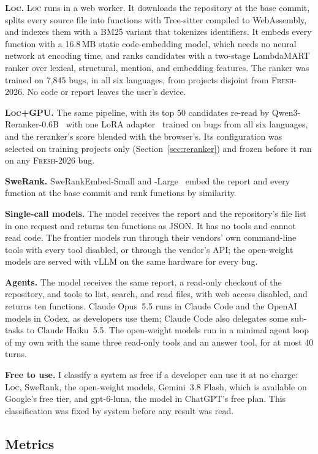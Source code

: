 \documentclass[acmsmall,screen,review,anonymous]{acmart}
\newcommand{\tool}{\textsc{Loc}\xspace}
\newcommand{\tool}{Allfather\xspace}
\newcommand{\toolgpu}{\tool{}+GPU\xspace}
\newcommand{\fresh}{\textsc{Fresh-2026}\xspace}
\begin{document}
\textbf{\tool.} \tool runs in a web worker. It downloads the repository at the base commit, splits every source file into functions with Tree-sitter compiled to WebAssembly, and indexes them with a BM25 variant that tokenizes identifiers. It embeds every function with a 16.8\,MB static code-embedding model, which needs no neural network at encoding time, and ranks candidates with a two-stage LambdaMART ranker over lexical, structural, mention, and embedding features. The ranker was trained on 7,845 bugs, in all six languages, from projects disjoint from \fresh. No code or report leaves the user's device.

\textbf{\toolgpu.} The same pipeline, with its top 50 candidates re-read by Qwen3-Reranker-0.6B~\cite{zhang2025qwen3embedding} with one LoRA adapter~\cite{hu2022lora} trained on bugs from all six languages, and the reranker's score blended with the browser's. Its configuration was selected on training projects only (Section~\ref{sec:reranker}) and frozen before it ran on any \fresh bug.

\textbf{SweRank.} SweRankEmbed-Small and -Large~\cite{reddy2025swerank} embed the report and every function at the base commit and rank functions by similarity.

\textbf{Single-call models.} The model receives the report and the repository's file list in one request and returns ten functions as JSON. It has no tools and cannot read code. The frontier models run through their vendors' own command-line tools with every tool disabled, or through the vendor's API; the open-weight models are served with vLLM on the same hardware for every bug.

\textbf{Agents.} The model receives the same report, a read-only checkout of the repository, and tools to list, search, and read files, with web access disabled, and returns ten functions. Claude Opus~5.5 runs in Claude Code and the OpenAI models in Codex, as developers use them; Claude Code also delegates some sub-tasks to Claude Haiku~5.5. The open-weight models run in a minimal agent loop of my own with the same three read-only tools and an answer tool, for at most 40 turns.

\textbf{Free to use.} I classify a system as free if a developer can use it at no charge: \tool, SweRank, the open-weight models, Gemini~3.8 Flash, which is available on Google's free tier, and gpt-6-luna, the model in ChatGPT's free plan. This classification was fixed by system before any result was read.

\subsection{Metrics}
\end{document}
